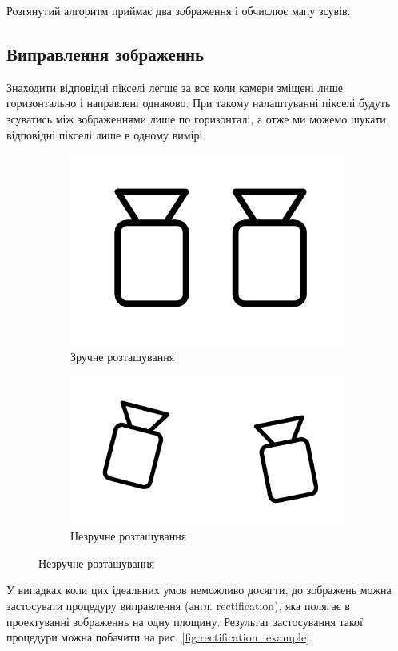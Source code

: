 \documentclass[11pt]{article}
\theoremstyle{definition}
\begin{document}
Розгянутий алгоритм приймає два зображення і обчислює мапу зсувів.

\subsection{Виправлення зображеннь}
Знаходити відповідні пікселі легше за все коли камери зміщені лише горизонтально і направлені однаково. При такому налаштуванні пікселі будуть зсуватись між зображеннями лише по горизонталі, а отже ми можемо шукати відповідні пікселі лише в одному вимірі.

\begin{figure}[h]
	\begin{subfigure}{.5\textwidth}
		\includegraphics[width=0.6\linewidth]{cameras_conveniently_placed}
		\centering
		\caption{Зручне розташування}
	\end{subfigure}
	\begin{subfigure}{.5\textwidth}
		\includegraphics[width=0.9\linewidth]{cameras_inconveniently_placed}
		\centering
		\caption{Незручне розташування}
	\end{subfigure}
	\centering
	\label{fig:camera_positions}
\end{figure}

У випадках коли цих ідеальних умов неможливо досягти, до зображень можна застосувати процедуру виправлення (англ. rectification), яка полягає в проектуванні зображеннь на одну площину. Результат застосування такої процедури можна побачити на рис. \ref{fig:rectification_example}.
\end{document}
